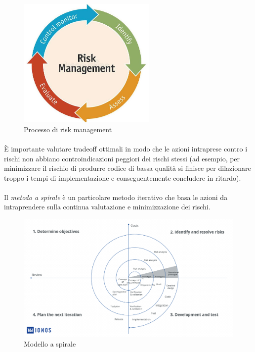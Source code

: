 \documentclass[11pt,a4paper,english]{article}
\begin{document}
\begin{figure}[H]
    \centering
    \includegraphics[width=0.6\textwidth]{img/risk_management.jpg}
    \caption{Processo di risk management}
\end{figure}

\paragraph{} È importante valutare tradeoff ottimali in modo che le azioni intraprese contro i rischi non abbiano controindicazioni peggiori dei rischi stessi (ad esempio, per minimizzare il rischio di produrre codice di bassa qualità si finisce per dilazionare troppo i tempi di implementazione e conseguentemente concludere in ritardo). 

\paragraph{} Il \emph{metodo a spirale} \cite{modelli_sviluppo} è un particolare metodo iterativo che basa le azioni da intraprendere sulla continua valutazione e minimizzazione dei rischi. 

\begin{figure}[H]
    \centering
    \includegraphics[width=1\textwidth]{img/modello_spirale.png}
    \caption{Modello a spirale}
\end{figure}
\end{document}
